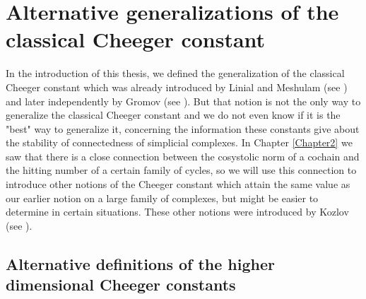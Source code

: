 
\chapter{Alternative generalizations of the classical Cheeger constant}

\label{Chapter6}

In the introduction of this thesis, we defined the generalization of the classical Cheeger constant which was already introduced by Linial and Meshulam (see \cite{2}) and later independently by Gromov (see \cite{3}). But that notion is not the only way to generalize the classical Cheeger constant and we do not even know if it is the "best" way to generalize it, concerning the information these constants give about the stability of connectedness of simplicial complexes. In Chapter \ref{Chapter2} we saw that there is a close connection between the cosystolic norm of a cochain and the hitting number of a certain family of cycles, so we will use this connection to introduce other notions of the Cheeger constant which attain the same value as our earlier notion on a large family of complexes, but might be easier to determine in certain situations. These other notions were introduced by Kozlov (see \cite{13}).

\section{Alternative definitions of the higher dimensional Cheeger constants}

